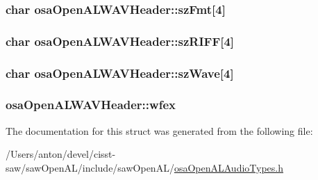 \subsubsection[{sz\+Fmt}]{\setlength{\rightskip}{0pt plus 5cm}char osa\+Open\+A\+L\+W\+A\+V\+Header\+::sz\+Fmt\mbox{[}4\mbox{]}}\label{structosa_open_a_l_w_a_v_header_a33de8f968564c7835cda9715a9f51956}
\hypertarget{structosa_open_a_l_w_a_v_header_a098b6f18d3e7817dfeba64ae1494d0f2}{}
\subsubsection[{sz\+R\+I\+F\+F}]{\setlength{\rightskip}{0pt plus 5cm}char osa\+Open\+A\+L\+W\+A\+V\+Header\+::sz\+R\+I\+F\+F\mbox{[}4\mbox{]}}\label{structosa_open_a_l_w_a_v_header_a098b6f18d3e7817dfeba64ae1494d0f2}
\hypertarget{structosa_open_a_l_w_a_v_header_a00ca16e2cba4d79c653c1a0d49ca4661}{}
\subsubsection[{sz\+Wave}]{\setlength{\rightskip}{0pt plus 5cm}char osa\+Open\+A\+L\+W\+A\+V\+Header\+::sz\+Wave\mbox{[}4\mbox{]}}\label{structosa_open_a_l_w_a_v_header_a00ca16e2cba4d79c653c1a0d49ca4661}
\hypertarget{structosa_open_a_l_w_a_v_header_a1bb12a739dfc5150d78795214c528d8a}{}
\subsubsection[{wfex}]{ osa\+Open\+A\+L\+W\+A\+V\+Header\+::wfex}\label{structosa_open_a_l_w_a_v_header_a1bb12a739dfc5150d78795214c528d8a}


The documentation for this struct was generated from the following file\+:\begin{DoxyCompactItemize}
\item 
/\+Users/anton/devel/cisst-\/saw/saw\+Open\+A\+L/include/saw\+Open\+A\+L/\hyperlink{osa_open_a_l_audio_types_8h}{osa\+Open\+A\+L\+Audio\+Types.\+h}\end{DoxyCompactItemize}
